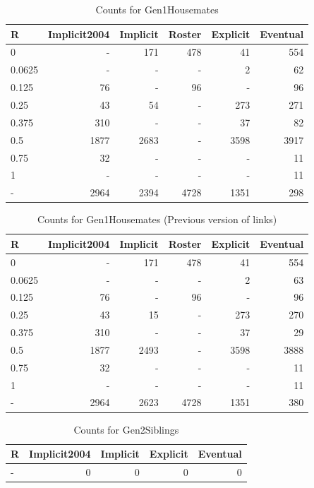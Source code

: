 \documentclass[a4paper]{article}\usepackage{graphicx, color}
\begin{document}
\begin{table}[ht]
\centering
{\large
\begin{tabular}{lrrrrr}
  \hline
R & Implicit2004 & Implicit & Roster & Explicit & Eventual \\ 
  \hline
0 & - & 171 & 478 &  41 & 554 \\ 
  0.0625 & - & - & - &   2 &  62 \\ 
  0.125 &  76 & - &  96 & - &  96 \\ 
  0.25 &  43 &  54 & - & 273 & 271 \\ 
  0.375 & 310 & - & - &  37 &  82 \\ 
  0.5 & 1877 & 2683 & - & 3598 & 3917 \\ 
  0.75 &  32 & - & - & - &  11 \\ 
  1 & - & - & - & - &  11 \\ 
  - & 2964 & 2394 & 4728 & 1351 & 298 \\ 
   \hline
\end{tabular}
}
\caption{Counts for Gen1Housemates} 
\end{table}
\begin{table}[ht]
\centering
{\large
\begin{tabular}{lrrrrr}
  \hline
R & Implicit2004 & Implicit & Roster & Explicit & Eventual \\ 
  \hline
0 & - & 171 & 478 &  41 & 554 \\ 
  0.0625 & - & - & - &   2 &  63 \\ 
  0.125 &  76 & - &  96 & - &  96 \\ 
  0.25 &  43 &  15 & - & 273 & 270 \\ 
  0.375 & 310 & - & - &  37 &  29 \\ 
  0.5 & 1877 & 2493 & - & 3598 & 3888 \\ 
  0.75 &  32 & - & - & - &  11 \\ 
  1 & - & - & - & - &  11 \\ 
  - & 2964 & 2623 & 4728 & 1351 & 380 \\ 
   \hline
\end{tabular}
}
\caption{Counts for Gen1Housemates (Previous version of links)} 
\end{table}
\begin{table}[ht]
\centering
{\large
\begin{tabular}{lrrrr}
  \hline
R & Implicit2004 & Implicit & Explicit & Eventual \\ 
  \hline
- &   0 &   0 &   0 &   0 \\ 
   \hline
\end{tabular}
}
\caption{Counts for Gen2Siblings} 
\end{table}
\end{document}
